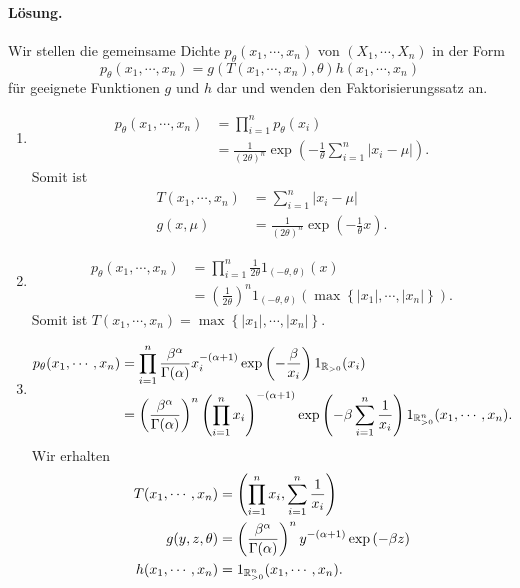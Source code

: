 \paragraph*{Lösung.} 
Wir stellen die gemeinsame Dichte $p_\theta(x_1, \cdots, x_n)$ von $(X_1, \cdots, X_n)$ in der Form
\begin{equation*}
    p_{\theta} (x_1, \cdots, x_n) = g(T(x_1, \cdots, x_n), \theta) h(x_1, \cdots, x_n)
\end{equation*}
für geeignete Funktionen $g$ und $h$ dar und wenden den Faktorisierungssatz an. 
\begin{enumerate}
    \item \begin{align*}
            p_\theta(x_1, \cdots, x_n) &= \prod_{i=1}^{n} p_\theta(x_i) \\
            &= \frac{1}{ (2\theta)^n} \exp \left( - \frac{1}{\theta} \sum_{i=1}^{n} | x_i - \mu | \right). 
        \end{align*}
        Somit ist 
        \begin{align*}
            T(x_1, \cdots, x_n) &= \sum_{i=1}^{n} | x_i - \mu | \\
            g(x, \mu)  &= \frac{1}{ (2\theta)^n} \exp \left( - \frac{1}{\theta} x \right).
        \end{align*}
    \item \begin{align*}
            p_\theta(x_1, \cdots, x_n) &= \prod_{i=1}^{n} \frac{1}{2\theta} 1_{\left( -\theta ,\theta \right)}(x) \\
            &= \left( \frac{1}{2\theta} \right)^n 1_{(-\theta, \theta)} ( \max \left\{  |x_1|, \cdots, |x_n| \right\}).
        \end{align*}
        Somit ist $T(x_1, \cdots, x_n) = \max \left\{  |x_1|, \cdots, |x_n| \right\}$. 
    \item \begin{align*}
            p_\theta(x_1, \cdots, x_n) &= \prod_{i=1}^{n} 
            \frac{\beta^\alpha}{\Gamma(\alpha)} x_i^{- (\alpha+1)} 
            \exp\left(  -\frac{\beta}{x_i} \right) 1_{\mathbb R_{>0}}(x_i) \\
            &= \left( \frac{\beta^\alpha}{\Gamma(\alpha)} \right)^n 
            \left( \prod_{i=1}^n x_i \right)^{-\left( \alpha+1 \right)}
            \exp \left( -\beta \sum_{i=1}^{n} \frac{1}{x_i} \right) 1_{ \mathbb R_{>0}^n} (x_1, \cdots, x_n).
        \end{align*}
        Wir erhalten
        \begin{align*}
            T(x_1, \cdots, x_n) &= \left( \prod_{i=1}^n x_i, \sum_{i=1}^{n} \frac{1}{x_i} \right) \\
            g(y,z, \theta) &= \left( \frac{\beta^\alpha}{\Gamma(\alpha)} \right)^n 
            y^{-\left( \alpha+1 \right)} \exp \left( -\beta z \right) \\
            h(x_1, \cdots, x_n) &= 1_{ \mathbb R_{>0}^n} (x_1, \cdots, x_n).
        \end{align*}
\end{enumerate}




